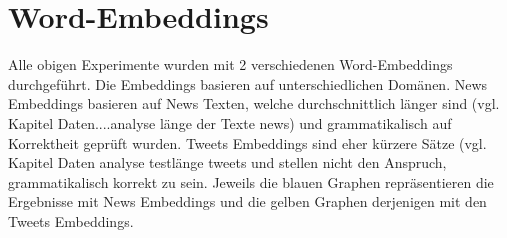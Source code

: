 

\section{Word-Embeddings}
Alle obigen Experimente wurden mit 2 verschiedenen Word-Embeddings durchgeführt. Die Embeddings basieren auf unterschiedlichen Domänen.
News Embeddings basieren auf News Texten, welche durchschnittlich länger sind (vgl. Kapitel Daten....analyse länge der Texte news) und grammatikalisch auf Korrektheit geprüft wurden.
Tweets Embeddings sind eher kürzere Sätze (vgl. Kapitel Daten analyse testlänge tweets und stellen nicht den Anspruch, grammatikalisch korrekt zu sein.
Jeweils die blauen Graphen repräsentieren die Ergebnisse mit News Embeddings und die gelben Graphen derjenigen mit den Tweets Embeddings.


